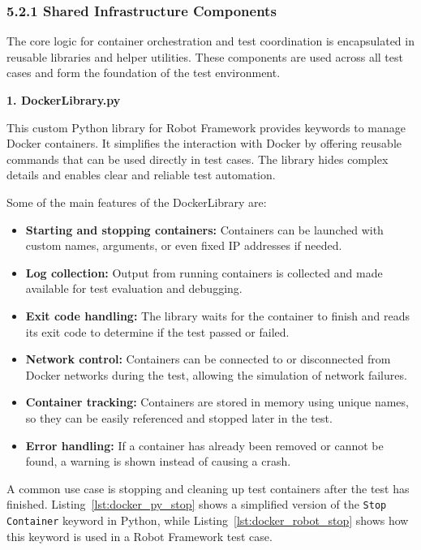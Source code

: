 \subsubsection*{5.2.1 Shared Infrastructure Components}

The core logic for container orchestration and test coordination is encapsulated in reusable libraries and helper utilities. These components are used across all test cases and form the foundation of the test environment.

\vspace{1em}
\textbf{1. DockerLibrary.py}

\vspace{0.3em}
This custom Python library for Robot Framework provides keywords to manage Docker containers. It simplifies the interaction with Docker by offering reusable commands that can be used directly in test cases. The library hides complex details and enables clear and reliable test automation.

\vspace{0.5em}
Some of the main features of the DockerLibrary are:

\begin{itemize}
	\item \textbf{Starting and stopping containers:} Containers can be launched with custom names, arguments, or even fixed IP addresses if needed.
	\item \textbf{Log collection:} Output from running containers is collected and made available for test evaluation and debugging.
	\item \textbf{Exit code handling:} The library waits for the container to finish and reads its exit code to determine if the test passed or failed.
	\item \textbf{Network control:} Containers can be connected to or disconnected from Docker networks during the test, allowing the simulation of network failures.
	\item \textbf{Container tracking:} Containers are stored in memory using unique names, so they can be easily referenced and stopped later in the test.
	\item \textbf{Error handling:} If a container has already been removed or cannot be found, a warning is shown instead of causing a crash.
\end{itemize}

\vspace{0.5em}
A common use case is stopping and cleaning up test containers after the test has finished. Listing~\ref{lst:docker_py_stop} shows a simplified version of the \texttt{Stop Container} keyword in Python, while Listing~\ref{lst:docker_robot_stop} shows how this keyword is used in a Robot Framework test case.


